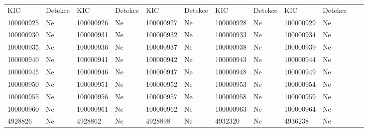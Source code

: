 \documentclass[a4paper,12pt]{article}
\begin{document}
{{{{{{{{{{{{{\begin{table}[!ht]
	\def\arraystretch{1.2}
	\setlength{\tabcolsep}{1pt}
	\begin{tabularx}{\textwidth}{|p{50pt}|X|p{50pt}|X|p{50pt}|X|p{50pt}|X|p{50pt}|X|p{50pt}|X|}
		\hline
		\rowcolor{lightgray}
		\multicolumn{10}{|c|}{\textbf{Negativní}} \\
		\hline
		\rowcolor{lightgray}
		KIC & Detekce & KIC & Detekce & KIC & Detekce & KIC & Detekce & KIC & Detekce \\	
		\hline
		100000925 & \cellcolor{lightgreen} Ne & 100000926 & \cellcolor{lightgreen} Ne & 100000927 & \cellcolor{lightgreen} Ne & 100000928 & \cellcolor{lightgreen} Ne & 100000929 & \cellcolor{lightgreen} Ne \\
		\hline
		100000930 & \cellcolor{lightgreen} Ne & 100000931 & \cellcolor{lightgreen} Ne & 100000932 & \cellcolor{lightgreen} Ne & 100000933 & \cellcolor{lightgreen} Ne & 100000934 & \cellcolor{lightgreen} Ne \\
		\hline
		100000935 & \cellcolor{lightgreen} Ne & 100000936 & \cellcolor{lightgreen} Ne & 100000937 & \cellcolor{lightgreen} Ne & 100000938 & \cellcolor{lightgreen} Ne & 100000939 & \cellcolor{lightgreen} Ne \\
		\hline
		100000940 & \cellcolor{lightgreen} Ne & 100000941 & \cellcolor{lightgreen} Ne & 100000942 & \cellcolor{lightgreen} Ne & 100000943 & \cellcolor{lightgreen} Ne & 100000944 & \cellcolor{lightgreen} Ne \\
		\hline
		100000945 & \cellcolor{lightgreen} Ne & 100000946 & \cellcolor{lightgreen} Ne & 100000947 & \cellcolor{lightgreen} Ne & 100000948 & \cellcolor{lightgreen} Ne & 100000949 & \cellcolor{lightgreen} Ne \\
		\hline
		100000950 & \cellcolor{lightgreen} Ne & 100000951 & \cellcolor{lightgreen} Ne & 100000952 & \cellcolor{lightgreen} Ne & 100000953 & \cellcolor{lightgreen} Ne & 100000954 & \cellcolor{lightgreen} Ne \\
		\hline
		100000955 & \cellcolor{lightgreen} Ne & 100000956 & \cellcolor{lightgreen} Ne & 100000957 & \cellcolor{lightgreen} Ne & 100000958 & \cellcolor{lightgreen} Ne & 100000959 & \cellcolor{lightgreen} Ne \\
		\hline
		100000960 & \cellcolor{lightgreen} Ne & 100000961 & \cellcolor{lightgreen} Ne & 100000962 & \cellcolor{lightgreen} Ne & 100000963 & \cellcolor{lightgreen} Ne & 100000964 & \cellcolor{lightgreen} Ne \\
		\hline
		4928826 & \cellcolor{lightgreen} Ne & 4928862 & \cellcolor{lightgreen} Ne & 4928898 & \cellcolor{lightgreen} Ne & 4932320 & \cellcolor{lightgreen} Ne & 4936238 & \cellcolor{lightgreen} Ne \\

\end{tabularx}
\end{table}}}}}}}}}}}}}}
\end{document}
